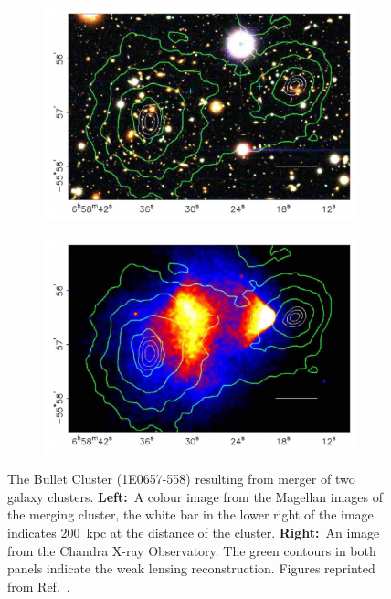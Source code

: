 \begin{figure}[ht!]
     \centering
     \begin{subfigure}{0.49\textwidth}
         \centering
         \includegraphics[width=\textwidth]{figures/DMOverview/f1a.new.jpeg2ps.png}
         \caption{}
         \label{fig:DMOverview/BCGravLensMap}
     \end{subfigure}
     \hfill
     \begin{subfigure}{0.49\textwidth}
         \centering
         \includegraphics[width=\textwidth]{figures/DMOverview/f1b.new.jpeg2ps.png}
         \caption{}
         \label{fig:DMOverview/BCXrayData}
     \end{subfigure}
     \caption[The Bullet Cluster (1E0657-558) resulting from merger of two galaxy clusters.]{The Bullet Cluster (1E0657-558) resulting from merger of two galaxy clusters. \textbf{Left:}~A colour image from the Magellan images of the merging cluster, the white bar in the lower right of the image indicates 200~kpc at the distance of the cluster. \textbf{Right:}~An image from the Chandra X-ray Observatory. The green contours in both panels indicate the weak lensing reconstruction. Figures reprinted from Ref.~\cite{Clowe2006}.}
     \label{fig:DMOverview/BulletCluster}
\end{figure}

